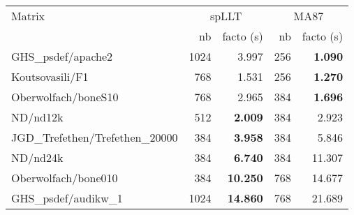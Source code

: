 \begin{tabular}{l|rr|rr}
  \hline
  Matrix                          & \multicolumn{2}{c}{spLLT} & \multicolumn{2}{c}{MA87}     \\
  \cline{2-5}
                                  & nb                        & facto (s)  & nb  & facto (s) \\
  \hline
  GHS\_psdef/apache2              & 1024                      & 3.997      & 256 & \bf 1.090 \\
  Koutsovasili/F1                 & 768                       & 1.531      & 256 & \bf 1.270 \\
  Oberwolfach/boneS10             & 768                       & 2.965      & 384 & \bf 1.696 \\
  ND/nd12k                        & 512                       & \bf 2.009  & 384 & 2.923     \\
  JGD\_Trefethen/Trefethen\_20000 & 384                       & \bf 3.958  & 384 & 5.846     \\
  ND/nd24k                        & 384                       & \bf 6.740  & 384 & 11.307    \\
  Oberwolfach/bone010             & 384                       & \bf 10.250 & 768 & 14.677    \\
  GHS\_psdef/audikw\_1            & 1024                      & \bf 14.860 & 768 & 21.689    \\
  \hline
\end{tabular}

